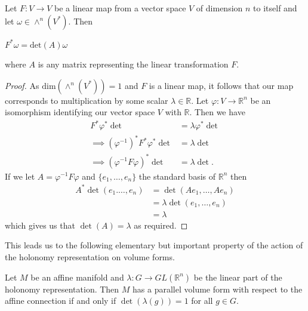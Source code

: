 \begin{lemma}
    Let $F: V \to V$ be a linear map from a vector space $V$ of dimension $n$ to itself
    and let $\omega \in \wedge^n(V^*)$. Then
    \begin{center}
        $F^*\omega = \text{det}(A)\omega$
    \end{center}
    where $A$ is any matrix representing the linear transformation $F$.
    \label{lemma:pullback-form-linearmap}
\end{lemma}
\begin{proof}
    As $\text{dim}(\wedge^n(V^*)) = 1$ and $F$ is a linear map, it follows that our map corresponds to multiplication
    by some scalar $\lambda \in \mathbb{R}$. Let $\varphi: V \to \mathbb{R}^n$ be an isomorphism identifying
    our vector space $V$ with $\mathbb{R}$. Then we have
    \begin{align*}
        F^*\varphi^*\det                           & = \lambda\varphi^* \det \\
        \implies (\varphi^{-1})^* F^*\varphi^*\det & = \lambda \det          \\
        \implies (\varphi^{-1} F \varphi)^*\det    & = \lambda \det.
    \end{align*}
    If we let $A = \varphi^{-1} F \varphi$ and $\{e_1, \dots , e_n\}$ the standard basis of $\mathbb{R}^n$
    then
    \begin{align*}
        A^*\det(e_1. \dots , e_n) & =  \det(Ae_1, \dots, Ae_n)       \\
                                  & = \lambda \det(e_1, \dots , e_n) \\
                                  & = \lambda
    \end{align*}
    which gives us that $\det(A)= \lambda$ as required.
\end{proof}

This leads us to the following elementary but important property of the action
of the holonomy representation on volume forms.
\begin{corollary}
    Let $M$ be an affine manifold and $\lambda: G \to  GL(\mathbb{R}^n)$ be the linear part of the holonomy
    representation. Then $M$ has a parallel volume form with respect to the affine connection if
    and only if $\det(\lambda(g)) = 1$ for all $g \in G$.\label{lemma:volume}
\end{corollary}

